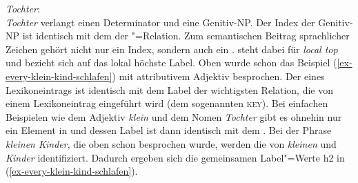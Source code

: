 \eas
\label{le-Tochter}%
\emph{Tochter}:\\
\zs
\emph{Tochter} verlangt einen Determinator und eine Genitiv-NP. Der Index der Genitiv-NP ist
identisch mit dem \argone der "=Relation. Zum semantischen Beitrag sprachlicher
Zeichen gehört nicht nur ein Index, sondern auch ein \ltopm. \ltop steht dabei für \emph{local top}
und bezieht sich auf das lokal höchste Label. Oben wurde schon das Beispiel (\ref{ex-every-klein-kind-schlafen}) mit attributivem
Adjektiv besprochen. Der \ltopw eines Lexikoneintrags ist identisch mit dem Label der wichtigsten Relation, die von einem
Lexikoneintrag eingeführt wird (dem sogenannten \textsc{key}). Bei einfachen Beispielen wie dem
Adjektiv \emph{klein} und dem Nomen \emph{Tochter} gibt es ohnehin nur ein Element in \rels und
dessen Label ist dann identisch mit dem \ltop. Bei der Phrase \emph{kleinen Kinder}\label{page-kleinen-Kinder}, die oben schon
besprochen wurde, werden die \ltopwe von \emph{kleinen} und \emph{Kinder} identifiziert. Dadurch
ergeben sich die gemeinsamen Label"=Werte h2 in (\ref{ex-every-klein-kind-schlafen}).

